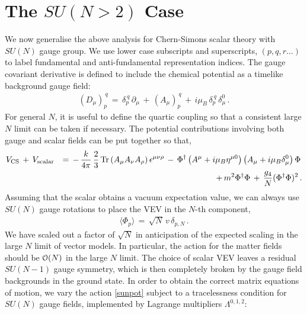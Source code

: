  \section{The $SU(N>2)$ Case}
 \label{sec4}
 We now generalise the above analysis for Chern-Simons scalar theory with $SU(N) $ gauge group. 
 We use lower case subscripts and superscripts, $(p,q,r\ldots)$ to label  fundamental and  anti-fundamental representation indices. The gauge covariant derivative is defined to include the chemical potential as a timelike background gauge field:
  \begin{eqnarray}
(D_{\mu})_{p}^{\ q}\,=\,\delta_{p}^{\ q}\,\partial_{\mu}\,+\,(A_{\mu})_{p}^{\ q}\,+\,i\mu_{B}\, \delta_{p}^{\ q}\,\delta_{\mu}^{0}\,. 
\end{eqnarray}
For general $N$, it is useful to define the quartic coupling so that a consistent large $N$ limit can be taken if necessary.  The potential contributions involving both gauge and scalar fields can be put together so that,
\begin{eqnarray}
V_{\rm CS}\,+\, V_{\rm scalar}&&=\, -\,\frac{k}{4\pi}\,\frac{2}{3}\,{\rm Tr}\left(A_\mu A_\nu A_\rho\right)\epsilon^{\mu\nu\rho}\,-\,
\Phi^{\dagger}\left(A^\mu + i\mu_B\eta^{\mu 0}\right)\left(A_\mu + i\mu_B\delta_{\mu}^0\right)\Phi\,\nonumber\\\label{sunpot}
&&%
+\,m^{2}\Phi^{\dagger}
\Phi\,+\,\frac{g_{4}}{N}(\Phi^{\dagger}\Phi)^{2}\,.
\end{eqnarray}
Assuming that the scalar obtains a vacuum expectation value, we can always use $SU(N)$ gauge rotations to place the VEV in the $N$-th component,
\begin{eqnarray}
\langle\Phi_{p}\rangle\,=\,\sqrt{N}\,v \,\delta_{p,N}\label{sclarvev}\,.
\end{eqnarray}
We have scaled out a factor of $\sqrt N$ in anticipation of the expected scaling in the  large $N$ limit of vector models. In particular, the action for the matter fields should be ${\cal O}(N)$ in the large $N$ limit.
The choice of scalar VEV leaves a residual $SU(N-1)$ gauge symmetry, which is then completely broken by the gauge field backgrounds in the ground state. In order to obtain the correct matrix equations of motion, we vary the action \eqref{sunpot} subject to a tracelessness condition for $SU(N)$ gauge fields, implemented by Lagrange multipliers $\Lambda^{0,1,2}$:
